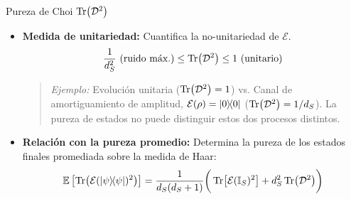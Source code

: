 \documentclass[10pt,handout]{beamer}
\begin{document}
%
%

\begin{frame}{Pureza de Choi $\Tr(\mathcal{D}^2)$}
\begin{itemize}
  \item \textbf{Medida de unitariedad:} Cuantifica la no-unitariedad de $\mathcal E$.
  \[ \frac{1}{d_S^2} \text{ (ruido máx.)} \leq \Tr(\mathcal{D}^2) \leq 1 \text{ (unitario)} \]
  \begin{quote}
    \small \textit{Ejemplo:} Evolución unitaria ($\Tr(\mathcal{D}^2)=1$) vs. Canal de amortiguamiento de amplitud, $\mathcal{E}(\rho) = \dyad{0}$ ($\Tr(\mathcal{D}^2)=1/d_S$). \alert{La pureza de estados no puede distinguir estos dos procesos distintos.}
  \end{quote}

  \item \textbf{Relación con la pureza promedio:} Determina la pureza de los estados finales promediada sobre la medida de Haar:
  \[
  \mathbb{E} \left[ \Tr(\mathcal{E}(\dyad{\psi})^2) \right] = \frac{1}{d_S(d_S + 1)} \bigg( \Tr[\mathcal{E}(\mathbb{I}_S)^2] + d_S^2 \Tr(\mathcal{D}^2) \bigg)
  \]
  
\end{itemize}
\end{frame}
\end{document}
